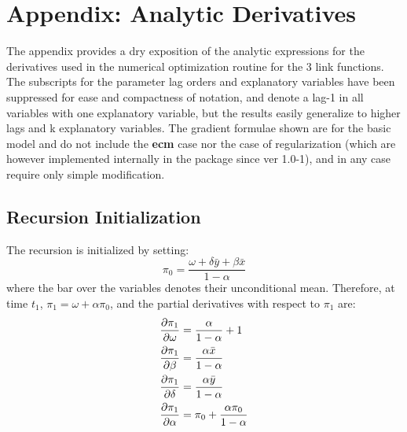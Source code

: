 \section{Appendix: Analytic Derivatives}\label{sec:Appendix}
The appendix provides a dry exposition of the analytic expressions for the derivatives used in the numerical
optimization routine for the 3 link functions. The subscripts for the parameter lag orders and explanatory
variables have been suppressed for ease and compactness of notation, and denote a lag-1 in all variables with
one explanatory variable, but the results easily generalize to higher lags and k explanatory variables.
The gradient formulae shown are for the basic model and do not include the \textbf{ecm} case nor the case of
regularization (which are however implemented internally in the package since ver 1.0-1), and in any case require
only simple modification.
\subsection{Recursion Initialization}
The recursion is initialized by setting:
\begin{equation}\label{eq:rcs}
{\pi _0} = \frac{{\omega  + \delta \bar y + \beta \bar x}}{{1 - \alpha }}
\end{equation}
where the bar over the variables denotes their unconditional mean. Therefore, at time $t_1$, ${\pi _1} = \omega  + \alpha {\pi _0}$, and the partial derivatives with respect to $\pi_1$ are:
\begin{equation}\label{eq:rcsderiv}
\begin{gathered}
  \frac{{\partial {\pi _1}}}
{{\partial \omega }} = \frac{\alpha }
{{1 - \alpha }} + 1 \hfill \\
  \frac{{\partial {\pi _1}}}
{{\partial \beta }} = \frac{{\alpha \bar x}}
{{1 - \alpha }} \hfill \\
  \frac{{\partial {\pi _1}}}
{{\partial \delta }} = \frac{{\alpha \bar y}}
{{1 - \alpha }} \hfill \\
  \frac{{\partial {\pi _1}}}
{{\partial \alpha }} = {\pi _0} + \frac{{\alpha {\pi _0}}}
{{1 - \alpha }} \hfill \\
\end{gathered}
\end{equation}
